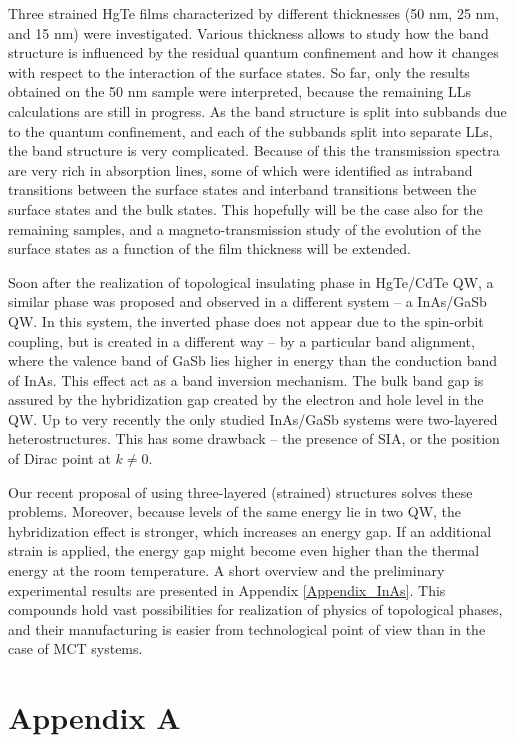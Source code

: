 \documentclass[titlepage,a4paper]{book}
\begin{document}
Three strained HgTe films characterized by different thicknesses (50 nm, 25 nm, and 15 nm) were investigated. Various thickness allows to study how the band structure is influenced by the residual quantum confinement and how it changes with respect to the interaction of the surface states. So far, only the results obtained on the 50 nm sample were interpreted, because the remaining LLs calculations are still in progress. As the band structure is split into subbands due to the quantum confinement, and each of the subbands split into separate LLs, the band structure is very complicated. Because of this the transmission spectra are very rich in absorption lines, some of which were identified as intraband transitions between the surface states and interband transitions between the surface states and the bulk states. This hopefully will be the case also for the remaining samples, and a magneto-transmission study of the evolution of the surface states as a function of the film thickness will be extended.
\vspace{5mm}

Soon after the realization of topological insulating phase in HgTe/CdTe QW, a similar phase was proposed and observed in a different system -- a InAs/GaSb QW. In this system, the inverted phase does not appear due to the spin-orbit coupling, but is created in a different way -- by a particular band alignment, where the valence band of GaSb lies higher in energy than the conduction band of InAs. This effect act as a band inversion mechanism. The bulk band gap is assured by the hybridization gap created by the electron and hole level in the QW. Up to very recently the only studied InAs/GaSb systems were two-layered heterostructures. This has some drawback -- the presence of SIA, or the position of Dirac point at $k \neq 0$.

Our recent proposal of using three-layered (strained) structures solves these problems. Moreover, because levels of the same energy lie in two QW, the hybridization effect is stronger, which increases an energy gap. If an additional strain is applied, the energy gap might become even higher than the thermal energy at the room temperature. A short overview and the preliminary experimental results are presented in Appendix \ref{Appendix_InAs}. This compounds hold vast possibilities for realization of physics of topological phases, and their manufacturing is easier from technological point of view than in the case of MCT systems.

\appendix
\iffalse
\chapter{Appendix A}
\end{document}
